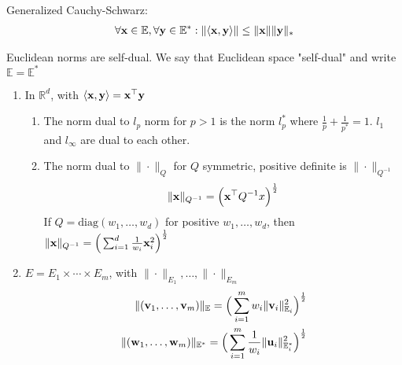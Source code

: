 \documentclass[11pt]{article}
\begin{document}
\begin{theorem}
    Generalized Cauchy-Schwarz:
    \begin{align*}
        \forall {\mathbf{x}} \in \mathbb{E}, \forall {\mathbf{y}} \in \mathbb{E}^*:
            \| \langle {\mathbf{x}},{\mathbf{y}} \rangle \| \le \| {\mathbf{x}} \| \| {\mathbf{y}} \| _{*}
    \end{align*}
\end{theorem}


\begin{theorem}
    Euclidean norms are self-dual. We say that Euclidean space "self-dual" and write $\mathbb{E} = \mathbb{E}^*$
\end{theorem}

\begin{example}
    \begin{enumerate}
        \item In $\mathbb{R}^d$, with $\langle {\mathbf{x}}, {\mathbf{y}} \rangle = {\mathbf{x}}^\top {\mathbf{y}}$
            \begin{enumerate}
                \item The norm dual to $l_{p}$ norm for $p > 1$ is the norm $l_{p}^*$ where 
                    $\frac{1}{p} + \frac{1}{p^*} = 1$. $l_1$ and $l_{\infty}$ are dual to each other.
                \item The norm dual to $\| \cdot \|_{Q}$ for $Q$ symmetric, positive definite is 
                        $\| \cdot \|_{Q^{-1}}$
                        \begin{align*}
                            \| {\mathbf{x}} \|_{Q^{-1}} = \Big({\mathbf{x}}^\top Q^{-1} x \Big)^{\frac{1}{2}}
                        \end{align*}
                        If $Q = \text{diag}(w_{1}, \ldots ,w_{d})$ for positive $w_{1}, \ldots ,w_{d}$,
                        then $\| {\mathbf{x}} \|_{Q^{-1}} = \Big(\sum_{i=1}^{d} \frac{1}{w_{i}}{\mathbf{x}}_{i}^2\Big)^{\frac{1}{2}}$
            \end{enumerate}
        \item $E = E_1 \times \cdots \times E_m$, with $\|  \cdot \|_{E_1}, \ldots , \|  \cdot \| _{E_{m}}$
            \begin{align*}
                \| ({\mathbf{v}}_{1}, \ldots ,{\mathbf{v}}_{m}) \|_{\mathbb{E}} = \Big(\sum_{i=1}^{m} w_{i} \| {\mathbf{v}}_{i} \|_{\mathbb{E}_{i}}^2 \Big)^{\frac{1}{2}}\\
                \| ({\mathbf{w}}_{1}, \ldots ,{\mathbf{w}}_{m}) \|_{\mathbb{E}^*} = \Big(\sum_{i=1}^{m} \frac{1}{w_{i}} \| {\mathbf{u}}_{i} \|_{\mathbb{E}_{i}^*}^2 \Big)^{\frac{1}{2}}
            \end{align*}
    \end{enumerate}
\end{example}
\end{document}
